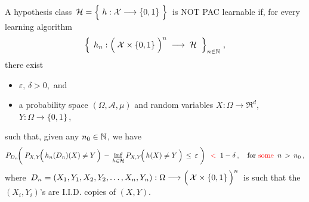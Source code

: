 \begin{remark}
\mbox{}\vskip 0.1cm
\noindent
A hypothesis class
\,$\mathcal{H} = \left\{\; h : \mathcal{X} \overset{{\color{white}-}}{\longrightarrow} \{0,1\} \;\right\}$\,
is NOT PAC learnable if, for every learning algorithm
\begin{equation*}
\left\{\;\,
	h_{n} : \left(\;\mathcal{X} \overset{{\color{white}.}}{\times} \{0,1\} \;\right)^{n}
	\; \longrightarrow \;\mathcal{H}
	\;\;\right\}_{n\in\N}\,,
\end{equation*}
there exist
\begin{itemize}
\item
	$\varepsilon,\, \delta > 0$,\, and
\item
	a probability space $(\Omega,\mathcal{A},\mu)$ and
	random variables $X : \Omega \longrightarrow \Re^{d}$,
	$Y : \Omega \longrightarrow \{0,1\}$\,,
\end{itemize}
such that, given any $n_{0} \in \mathbb{N}$, we have
\begin{equation*}
P_{D_{n}}\!\!\left(\;
	P_{X,Y}\!\!\left(\,\overset{{\color{white}.}}{h}_{n}(D_{n})(X) \neq Y \,\right)
		\,-\,
		\underset{h\in\mathcal{H}}{\inf}\,P_{X,Y}\!\!\left(\,\overset{{\color{white}.}}{h}(X) \neq Y \,\right)
	\,\leq\,
		\varepsilon
	\;\right)
\;\; {\color{red}<} \;\;
	1 - \delta\,,
\quad
	\textnormal{for {\color{red}some} \,$n \,>\, n_{0}$}\,,
\end{equation*}
where
\,$D_{n} = (X_{1},Y_{1},X_{2},Y_{2},\ldots,X_{n},Y_{n})
	: \Omega \longrightarrow
	\left(\,\mathcal{X}\overset{{\color{white}.}}{\times}\{0,1\}\,\right)^{n}$\,
is such that the
$(X_{i},Y_{i})$'s are I.I.D. copies of $(X,Y)$.
\end{remark}



\renewcommand{\theenumi}{\roman{enumi}}
\renewcommand{\labelenumi}{\textnormal{(\theenumi)}$\;\;$}

